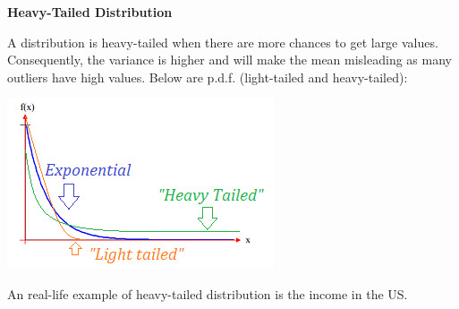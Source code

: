 {\fontsize{12pt}{22pt} \textbf{Heavy-Tailed Distribution}\par}

\vspace{5mm}

A distribution is heavy-tailed when there are more chances to get large values. Consequently, the variance is higher and will make the mean misleading as many outliers have high values. Below are p.d.f. (light-tailed and heavy-tailed):

\vspace{5mm}

\begin{center}
\includegraphics[scale=0.8]{heavy-light-tailed.png}
\end{center}

An real-life example of heavy-tailed distribution is the income in the US.

\vspace{5mm}
